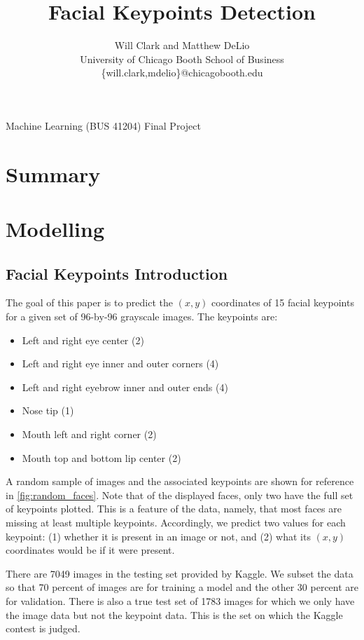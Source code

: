 \documentclass[journal]{IEEEtran}
\begin{document}
\title{Facial Keypoints Detection}
\author{Will Clark and Matthew DeLio\\
University of Chicago Booth School of Business\\
\textsf{\{will.clark,mdelio\}@chicagobooth.edu}}

{Machine Learning (BUS 41204) Final Project}

\maketitle

\section{Summary}

\section{Modelling}

\subsection{Facial Keypoints Introduction}

The goal of this paper is to predict the $(x,y)$ coordinates of 15 facial keypoints for a given set of 96-by-96 grayscale images. The keypoints are:
\begin{itemize}
\item Left and right eye center (2)
\item Left and right eye inner and outer corners (4)
\item Left and right eyebrow inner and outer ends (4)
\item Nose tip (1)
\item Mouth left and right corner (2)
\item Mouth top and bottom lip center (2)
\end{itemize}
A random sample of images and the associated keypoints are shown for reference in \cref{fig:random_faces}. Note that of the displayed faces, only two have the full set of keypoints plotted. This is a feature of the data, namely, that most faces are missing at least multiple keypoints. Accordingly, we predict two values for each keypoint: (1) whether it is present in an image or not, and (2) what its $(x,y)$ coordinates would be if it were present.

There are 7049 images in the testing set provided by Kaggle. We subset the data so that 70 percent of images are for training a model and the other 30 percent are for validation. There is also a true test set of 1783 images for which we only have the image data but not the keypoint data. This is the set on which the Kaggle contest is judged.
\end{document}
